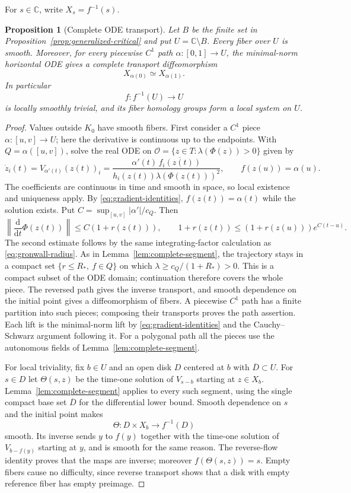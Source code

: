 \documentclass[11pt]{article}
\numberwithin{equation}{section}
\newtheorem{proposition}[theorem]{Proposition}
\theoremstyle{definition}
\theoremstyle{remark}
\newcommand{\C}{\mathbb C}
\newcommand{\dd}{\mathrm d}
\begin{document}
For $s\in\C$, write $X_s=f^{-1}(s)$.
\begin{proposition}[Complete ODE transport]\label{prop:bifurcation}
Let $B$ be the finite set in Proposition~\ref{prop:generalized-critical}
and put $U=\C\setminus B$.  Every fiber over $U$ is smooth.  Moreover,
for every piecewise $C^1$ path $\alpha:[0,1]\to U$, the minimal-norm
horizontal ODE gives a complete transport diffeomorphism
\[
 X_{\alpha(0)}\simeq X_{\alpha(1)}.
\]
In particular
\[
 f:f^{-1}(U)\longrightarrow U
\]
is locally smoothly trivial, and its fiber homology groups form a local
system on $U$.
\end{proposition}
\begin{proof}
Values outside $K_0$ have smooth fibers. First consider a $C^1$ piece
$\alpha:[u,v]\to U$; here the derivative is continuous up to the endpoints.
With $Q=\alpha([u,v])$, solve the real ODE on
$\mathcal O=\{z\in T:\lambda(\Phi(z))>0\}$ given by
\begin{equation}\label{eq:horizontal-ode}
 \dot z_i(t)=V_{\alpha'(t)}(z(t))_i
 =\frac{\alpha'(t)\,\overline{f_i(z(t))}}
        {h_i(z(t))\lambda(\Phi(z(t)))^2},
 \qquad f(z(u))=\alpha(u).
\end{equation}
The coefficients are continuous in time and smooth in space, so local
existence and uniqueness apply. By \eqref{eq:gradient-identities},
$f(z(t))=\alpha(t)$ while the solution exists. Put
$C=\sup_{[u,v]}|\alpha'|/c_Q$. Then
\begin{equation}\label{eq:linear-growth}
 \left\|\frac{\dd}{\dd t}\Phi(z(t))\right\|
 \le C(1+r(z(t))),\qquad
 1+r(z(t))\le(1+r(z(u)))e^{C(t-u)}.
\end{equation}
The second estimate follows by the same integrating-factor calculation
as \eqref{eq:gronwall-radius}. As in Lemma~\ref{lem:complete-segment},
the trajectory stays in a compact set $\{r\le R_*,\ f\in Q\}$ on which
$\lambda\ge c_Q/(1+R_*)>0$. This is a compact subset of the ODE domain;
continuation therefore covers the whole piece. The reversed path gives
the inverse transport, and smooth dependence on the initial point gives
a diffeomorphism of fibers. A piecewise $C^1$ path has a finite partition
into such pieces; composing their transports proves the path assertion.
Each lift is the minimal-norm lift by \eqref{eq:gradient-identities} and
the Cauchy--Schwarz argument following it. For a polygonal path all the
pieces use the autonomous fields of Lemma~\ref{lem:complete-segment}.

For local triviality, fix $b\in U$ and an open disk $D$ centered at $b$
with $\overline D\subset U$. For $s\in D$ let $\Theta(s,z)$ be the
time-one solution of $V_{s-b}$ starting at $z\in X_b$.
Lemma~\ref{lem:complete-segment} applies to every such segment, using the
single compact base set $\overline D$ for the differential lower bound.
Smooth dependence on $s$ and the initial point makes
\[
 \Theta:D\times X_b\longrightarrow f^{-1}(D)
\]
smooth. Its inverse sends $y$ to $f(y)$ together with the time-one
solution of $V_{b-f(y)}$ starting at $y$, and is smooth for the same
reason. The reverse-flow identity proves that the maps are inverse;
moreover $f(\Theta(s,z))=s$. Empty fibers cause no difficulty, since
reverse transport shows that a disk with empty reference fiber has
empty preimage.


\end{proof}
\end{document}
